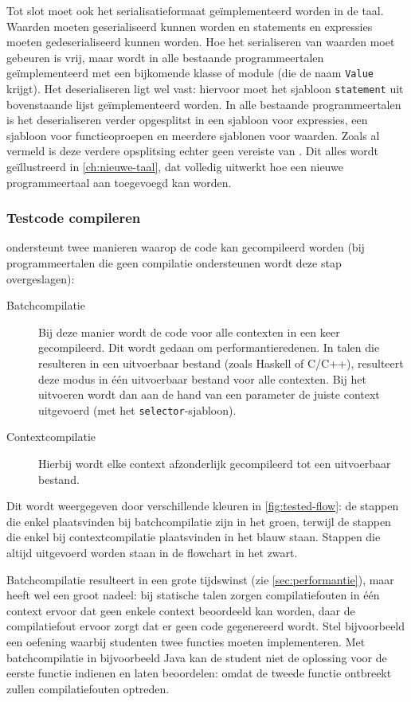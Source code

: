 Tot slot moet ook het serialisatieformaat geïmplementeerd worden in de taal.
Waarden moeten geserialiseerd kunnen worden en statements en expressies moeten gedeserialiseerd kunnen worden.
Hoe het serialiseren van waarden moet gebeuren is vrij, maar wordt in alle bestaande programmeertalen geïmplementeerd met een bijkomende klasse of module (die de naam \texttt{Value} krijgt).
Het deserialiseren ligt wel vast: hiervoor moet het sjabloon \texttt{statement} uit bovenstaande lijst geïmplementeerd worden.
In alle bestaande programmeertalen is het deserialiseren verder opgesplitst in een sjabloon voor expressies, een sjabloon voor functieoproepen en meerdere sjablonen voor waarden.
Zoals al vermeld is deze verdere opsplitsing echter geen vereiste van \tested{}.
Dit alles wordt geïllustreerd in \cref{ch:nieuwe-taal}, dat volledig uitwerkt hoe een nieuwe programmeertaal aan \tested{} toegevoegd kan worden.

\subsubsection{Testcode compileren}

\tested{} ondersteunt twee manieren waarop de code kan gecompileerd worden (bij programmeertalen die geen compilatie ondersteunen wordt deze stap overgeslagen):

\begin{description}
    \item[Batchcompilatie] Bij deze manier wordt de code voor alle contexten in een keer gecompileerd.
    Dit wordt gedaan om performantieredenen.
    In talen die resulteren in een uitvoerbaar bestand (zoals Haskell of C/C++), resulteert deze modus in één uitvoerbaar bestand voor alle contexten.
    Bij het uitvoeren wordt dan aan de hand van een parameter de juiste context uitgevoerd (met het \texttt{selector}-sjabloon).
    \item[Contextcompilatie] Hierbij wordt elke context afzonderlijk gecompileerd tot een uitvoerbaar bestand.
\end{description}

Dit wordt weergegeven door verschillende kleuren in \cref{fig:tested-flow}: de stappen die enkel plaatsvinden bij batchcompilatie zijn in het \textcolor{ugent-ps}{groen}, terwijl de stappen die enkel bij contextcompilatie plaatsvinden in het \textcolor{ugent-we}{blauw} staan.
Stappen die altijd uitgevoerd worden staan in de flowchart in het zwart.

Batchcompilatie resulteert in een grote tijdswinst (zie \cref{sec:performantie}), maar heeft wel een groot nadeel: bij statische talen zorgen compilatiefouten in één context ervoor dat geen enkele context beoordeeld kan worden, daar de compilatiefout ervoor zorgt dat er geen code gegenereerd wordt.
Stel bijvoorbeeld een oefening waarbij studenten twee functies moeten implementeren.
Met batchcompilatie in bijvoorbeeld Java kan de student niet de oplossing voor de eerste functie indienen en laten beoordelen: omdat de tweede functie ontbreekt zullen compilatiefouten optreden.

